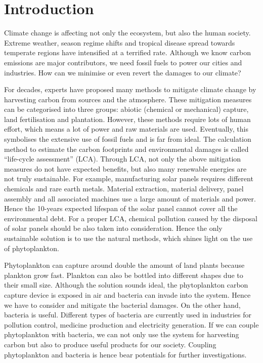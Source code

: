 \documentclass[../thesis.tex]{subfiles} %
\begin{document}
\section{Introduction}

Climate change is affecting not only the ecosystem, but also the human society.  Extreme weather, season regime shifts and tropical disease spread towards temperate regions have intensified at a terrified rate.  Although we know carbon emissions are major contributors, we need fossil fuels to power our cities and industries.  How can we minimise or even revert the damages to our climate?

For decades, experts have proposed many methods to mitigate climate change by harvesting carbon from sources and the atmosphere.  These mitigation measures can be categorised into three groups: abiotic (chemical or mechanical) capture, land fertilisation and plantation.  However, these methods require lots of human effort, which means a lot of power and raw materials are used.  Eventually, this symbolises the extensive use of fossil fuels and is far from ideal.  The calculation method to estimate the carbon footprints and environmental damages is called ``life-cycle assessment” (LCA).  Through LCA, not only the above mitigation measures do not have expected benefits, but also many renewable energies are not truly sustainable.  For example, manufacturing solar panels requires different chemicals and rare earth metals.  Material extraction, material delivery, panel assembly and all associated machines use a large amount of materials and power.  Hence the 10-years expected lifespan of the solar panel cannot cover all the environmental debt.  For a proper LCA, chemical pollution caused by the disposal of solar panels should be also taken into consideration.  Hence the only sustainable solution is to use the natural methods, which shines light on the use of phytoplankton.

Phytoplankton can capture around double the amount of land plants because plankton grow fast.  Plankton can also be bottled into different shapes due to their small size.  Although the solution sounds ideal, the phytoplankton carbon capture device is exposed in air and bacteria can invade into the system.  Hence we have to consider and mitigate the bacterial damages.  On the other hand, bacteria is useful.  Different types of bacteria are currently used in industries for pollution control, medicine production and electricity generation.  If we can couple phytoplankton with bacteria, we can not only use the system for harvesting carbon but also to produce useful products for our society.  Coupling phytoplankton and bacteria is hence bear potentials for further investigations.
\end{document}
